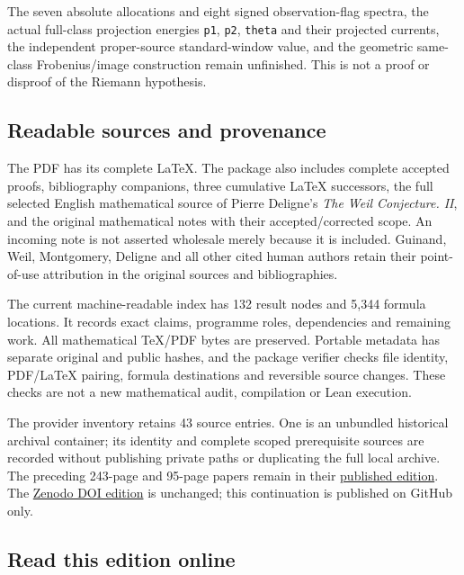 \documentclass[
]{article}
\begin{document}
The seven absolute allocations and eight signed observation-flag
spectra, the actual full-class projection energies \texttt{p1},
\texttt{p2}, \texttt{theta} and their projected currents, the
independent proper-source standard-window value, and the geometric
same-class Frobenius/image construction remain unfinished. This is not a
proof or disproof of the Riemann hypothesis.

\subsection{Readable sources and
provenance}\label{readable-sources-and-provenance}

The PDF has its complete LaTeX. The package also includes complete
accepted proofs, bibliography companions, three cumulative LaTeX
successors, the full selected English mathematical source of Pierre
Deligne's \emph{The Weil Conjecture. II}, and the original mathematical
notes with their accepted/corrected scope. An incoming note is not
asserted wholesale merely because it is included. Guinand, Weil,
Montgomery, Deligne and all other cited human authors retain their
point-of-use attribution in the original sources and bibliographies.

The current machine-readable index has 132 result nodes and 5,344
formula locations. It records exact claims, programme roles,
dependencies and remaining work. All mathematical TeX/PDF bytes are
preserved. Portable metadata has separate original and public hashes,
and the package verifier checks file identity, PDF/LaTeX pairing,
formula destinations and reversible source changes. These checks are not
a new mathematical audit, compilation or Lean execution.

The provider inventory retains 43 source entries. One is an unbundled
historical archival container; its identity and complete scoped
prerequisite sources are recorded without publishing private paths or
duplicating the full local archive. The preceding 243-page and 95-page
papers remain in their
\href{https://github.com/KokunoYumeto/zeta-function-research-reader/tree/0562d35abb20ec87be85aba00a6206fcd843cd58/workbenches/splitzero-tandem/continuations/20260919-arithmetic-signs-marked-classes/}{published
edition}. The \href{https://doi.org/10.5281/zenodo.22821108}{Zenodo DOI
edition} is unchanged; this continuation is published on GitHub only.

\subsection{Read this edition online}\label{read-this-edition-online}
\end{document}

